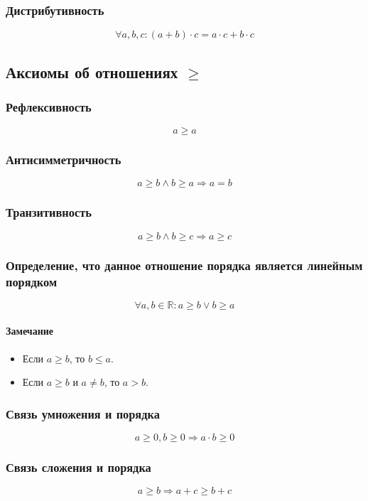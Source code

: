 \documentclass{article}
\begin{document}
\subsubsection{Дистрибутивность}
\[
    \forall a, b, c: (a + b) \cdot c = a \cdot c + b \cdot c
\]


\subsection{Аксиомы об отношениях $\ge$}

\subsubsection{Рефлексивность}
\[
    a \ge a
\]

\subsubsection{Антисимметричность}
\[
    a \ge b \wedge b \ge a \Rightarrow a = b
\]

\subsubsection{Транзитивность}
\[
    a \ge b \wedge b \ge c \Rightarrow a \ge c
\]

\subsubsection{Определение, что данное отношение порядка является линейным порядком}
\[
    \forall a, b \in \mathbb{R}: a \ge b \vee b \ge a
\]

\paragraph{Замечание}
\begin{itemize}
    \item Если $a \ge b$, то $b \le a$.
    \item Если $a \ge b$ и $a \neq b$, то $a > b$.
\end{itemize}

\subsubsection{Связь умножения и порядка}
\[
    a \ge 0, b \ge 0 \Rightarrow a \cdot b \ge 0
\]

\subsubsection{Связь сложения и порядка}
\[
    a \ge b \Rightarrow a + c \ge b + c
\]
\end{document}
